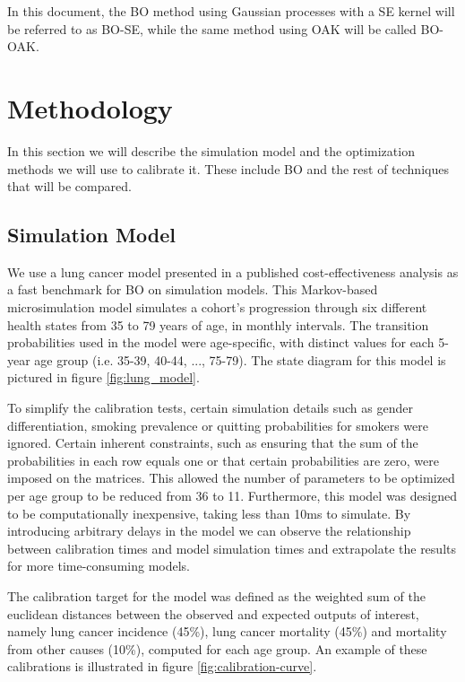 \documentclass[sn-mathphys,Numbered]{sn-jnl}%
\begin{document}
In this document, the BO method using Gaussian processes with a SE kernel will be referred to as BO-SE, while the same method using OAK will be called BO-OAK.

\section{Methodology}
In this section we will describe the simulation model and the optimization methods we will use to calibrate it. These include BO and the rest of techniques that will be compared.

\subsection{Simulation Model}
\label{sec:simulation-model}
We use a lung cancer model presented in a published cost-effectiveness analysis\cite{lung-model} as a fast benchmark for BO on simulation models. This Markov-based microsimulation model simulates a cohort's progression through six different health states from 35 to 79 years of age, in monthly intervals. The transition probabilities used in the model were age-specific, with distinct values for each 5-year age group (i.e. 35-39, 40-44, ..., 75-79). The state diagram for this model is pictured in figure \ref{fig:lung_model}.

To simplify the calibration tests, certain simulation details such as gender differentiation, smoking prevalence or quitting probabilities for smokers were ignored. Certain inherent constraints, such as ensuring that the sum of the probabilities in each row equals one or that certain probabilities are zero, were imposed on the matrices. This allowed the number of parameters to be optimized per age group to be reduced from 36 to 11. Furthermore, this model was designed to be computationally inexpensive, taking less than 10ms to simulate. By introducing arbitrary delays in the model we can observe the relationship between calibration times and model simulation times and extrapolate the results for more time-consuming models.

The calibration target for the model was defined as the weighted sum of the euclidean distances between the observed and expected outputs of interest, namely lung cancer incidence (45\%), lung cancer mortality (45\%) and mortality from other causes (10\%), computed for each age group. An example of these calibrations is illustrated in figure \ref{fig:calibration-curve}.
\end{document}
